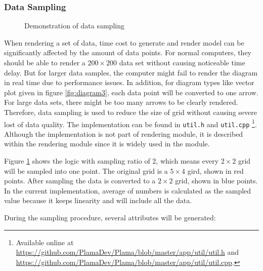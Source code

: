 \subsubsection{Data Sampling} \label{sec:sampling}

\begin{figure}[!tb]
	\centering
	 \hspace{1.5em}
	 \hspace{1em}
	\caption{Demonstration of data sampling}
	\label{fig:sample}
\end{figure}

When rendering a set of data, time cost to generate and render model can be significantly affected by the amount of data points. For normal computers, they should be able to render a $200\times200$ data set without causing noticeable time delay. But for larger data samples, the computer might fail to render the diagram in real time due to performance issues. In addition, for diagram types like vector plot given in figure \ref{fig:diagram3}, each data point will be converted to one arrow. For large data sets, there might be too many arrows to be clearly rendered. Therefore, data sampling is used to reduce the size of grid without causing severe lost of data quality. The implementation can be found in \lstinline{util.h} and \lstinline{util.cpp} \footnote{Available online at \url{https://github.com/PlamaDev/Plama/blob/master/app/util/util.h} and \url{https://github.com/PlamaDev/Plama/blob/master/app/util/util.cpp}.}. Although the implementation is not part of rendering module, it is described within the rendering module since it is widely used in the module.

Figure \ref{fig:sample} shows the logic with sampling ratio of 2, which means every $2\times2$ grid will be sampled into one point. The original grid is a $5\times4$ gird, shown in red points. After sampling the data is converted to a $2\times2$ grid, shown in blue points. In the current implementation, average of numbers is calculated as the sampled value because it keeps linearity and will include all the data.

During the sampling procedure, several attributes will be generated:

